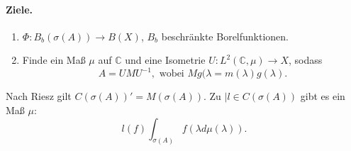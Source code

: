 \documentclass[12pt,a4paper,titlepage]{scrartcl}
\numberwithin{equation}{section}
\newcommand{\C}{\mathbb{C}} %
\begin{document}
	\paragraph{Ziele.} 
	\begin{enumerate}[1)]
		\item $\Phi: B_b(\sigma(A)) \rightarrow B(X)$, $B_b$ beschränkte Borelfunktionen.
		\item Finde ein Maß $\mu$ auf $\C$ und eine Isometrie $U: L^2(\C,\mu)\rightarrow X$, sodass 
		$$A=UMU^{-1},\text{ wobei } Mg(\lambda = m(\lambda)g(\lambda).$$
	\end{enumerate}
	
	Nach Riesz gilt $C(\sigma(A))' = M(\sigma(A))$. Zu $|l\in C(\sigma(A))$ gibt es ein Maß $\mu$:
	$$l(f)\int_{\sigma(A)}f(\lambda d\mu(\lambda)).$$

	
	
	
	
	
	
	
	
	
	
	
	
	
	
	
	
	
	
	
	
	
	
	
	
	
	
	
	
	
	
	
	
	
	
	
	
	
	
	
	
	
	
	
	
	
	
\end{document}
